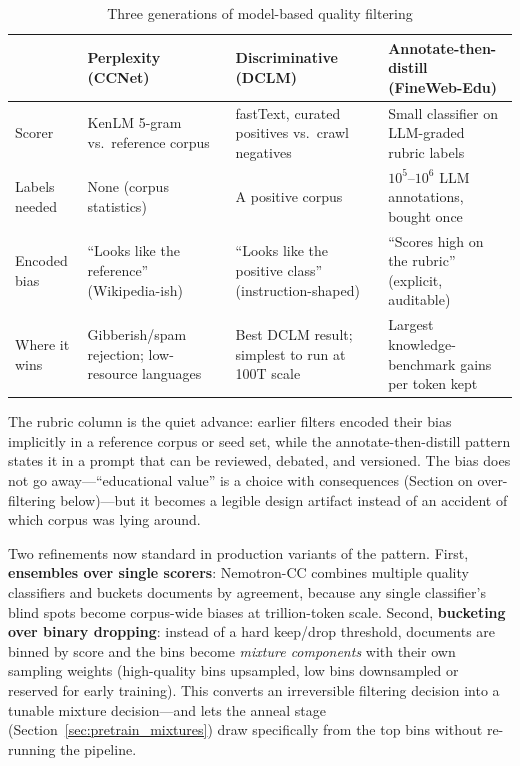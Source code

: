 \begin{table}[H]
\centering
\small
\caption{Three generations of model-based quality filtering}
\label{tab:pretrain_filter_generations}
\begin{tabularx}{\textwidth}{lXXX}
\toprule
 & \textbf{Perplexity (CCNet)} & \textbf{Discriminative (DCLM)} & \textbf{Annotate-then-distill (FineWeb-Edu)} \\
\midrule
Scorer & KenLM 5-gram vs.\ reference corpus & fastText, curated positives vs.\ crawl negatives & Small classifier on LLM-graded rubric labels \\
Labels needed & None (corpus statistics) & A positive corpus & $10^5$--$10^6$ LLM annotations, bought once \\
Encoded bias & ``Looks like the reference'' (Wikipedia-ish) & ``Looks like the positive class'' (instruction-shaped) & ``Scores high on the rubric'' (explicit, auditable) \\
Where it wins & Gibberish/spam rejection; low-resource languages & Best DCLM result; simplest to run at 100T scale & Largest knowledge-benchmark gains per token kept \\
\bottomrule
\end{tabularx}
\end{table}

The rubric column is the quiet advance: earlier filters encoded their bias implicitly in a reference corpus or seed set, while the annotate-then-distill pattern states it in a prompt that can be reviewed, debated, and versioned. The bias does not go away---``educational value'' is a choice with consequences (Section on over-filtering below)---but it becomes a legible design artifact instead of an accident of which corpus was lying around.

Two refinements now standard in production variants of the pattern. First, \textbf{ensembles over single scorers}: Nemotron-CC combines multiple quality classifiers and buckets documents by agreement, because any single classifier's blind spots become corpus-wide biases at trillion-token scale. Second, \textbf{bucketing over binary dropping}: instead of a hard keep/drop threshold, documents are binned by score and the bins become \textit{mixture components} with their own sampling weights (high-quality bins upsampled, low bins downsampled or reserved for early training). This converts an irreversible filtering decision into a tunable mixture decision---and lets the anneal stage (Section~\ref{sec:pretrain_mixtures}) draw specifically from the top bins without re-running the pipeline.


